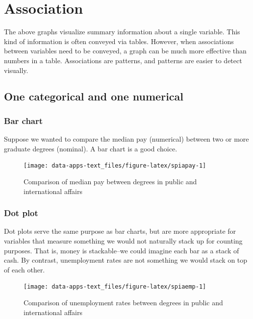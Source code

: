 \documentclass[
]{book}
\begin{document}
\hypertarget{association}{%
\section{Association}\label{association}}

The above graphs visualize summary information about a single variable. This kind of information is often conveyed via tables. However, when associations between variables need to be conveyed, a graph can be much more effective than numbers in a table. Associations are patterns, and patterns are easier to detect visually.

\hypertarget{one-categorical-and-one-numerical}{%
\subsection{One categorical and one numerical}\label{one-categorical-and-one-numerical}}

\hypertarget{bar-chart-1}{%
\subsubsection{Bar chart}\label{bar-chart-1}}

Suppose we wanted to compare the median pay (numerical) between two or more graduate degrees (nominal). A bar chart is a good choice.

\begin{figure}

{\centering \texttt{[image: data-apps-text\_files/figure-latex/spiapay-1]} 

}

\caption{Comparison of median pay between degrees in public and international affairs}\label{fig:spiapay}
\end{figure}

\hypertarget{dot-plot}{%
\subsubsection{Dot plot}\label{dot-plot}}

Dot plots serve the same purpose as bar charts, but are more appropriate for variables that measure something we would not naturally stack up for counting purposes. That is, money is stackable--we could imagine each bar as a stack of cash. By contrast, unemployment rates are not something we would stack on top of each other.

\begin{figure}

{\centering \texttt{[image: data-apps-text\_files/figure-latex/spiaemp-1]} 

}

\caption{Comparison of unemployment rates between degrees in public and international affairs}\label{fig:spiaemp}
\end{figure}
\end{document}
